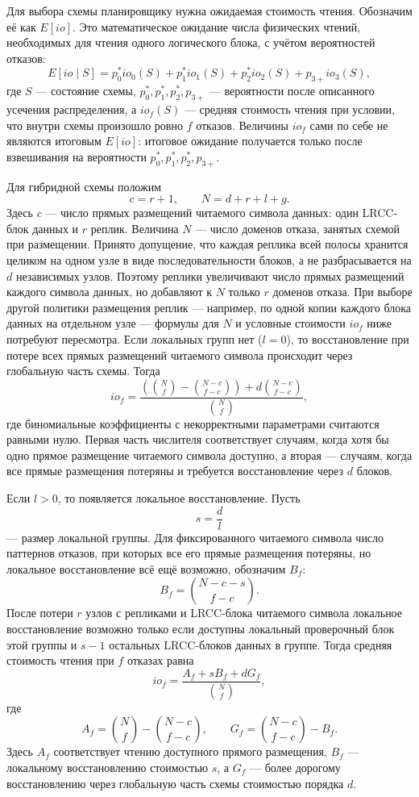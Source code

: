 Для выбора схемы планировщику нужна ожидаемая стоимость чтения. Обозначим её
как \(E[io]\). Это математическое ожидание числа физических чтений, необходимых
для чтения одного логического блока, с учётом вероятностей отказов:
\[
    E[io \mid S] =
    p_0^* io_0(S) + p_1^* io_1(S) + p_2^* io_2(S) + p_{3+} io_3(S),
\]
где \(S\) --- состояние схемы, \(p_0^*,p_1^*,p_2^*,p_{3+}\) --- вероятности
после описанного усечения распределения, а \(io_f(S)\) --- средняя стоимость
чтения при условии, что внутри схемы произошло ровно \(f\) отказов. Величины
\(io_f\) сами по себе не являются итоговым \(E[io]\): итоговое ожидание
получается только после взвешивания на вероятности \(p_0^*,p_1^*,p_2^*,p_{3+}\).

Для гибридной схемы положим
\[
    c = r + 1,\qquad N = d + r + l + g.
\]
Здесь \(c\) --- число прямых размещений читаемого символа данных: один
LRCC-блок данных и \(r\) реплик. Величина \(N\) --- число доменов отказа,
занятых схемой при размещении. Принято допущение, что каждая реплика всей
полосы хранится целиком на одном узле в виде последовательности блоков, а не
разбрасывается на \(d\) независимых узлов. Поэтому реплики увеличивают число
прямых размещений каждого символа данных, но добавляют к \(N\) только
\(r\) доменов отказа. При выборе другой политики размещения реплик ---
например, по одной копии каждого блока данных на отдельном узле --- формулы для
\(N\) и условные стоимости \(io_f\) ниже потребуют пересмотра.
Если локальных групп нет (\(l=0\)), то восстановление при потере всех прямых
размещений читаемого символа происходит через глобальную часть схемы. Тогда
\[
    io_f =
    \frac{
        \left(\binom{N}{f} - \binom{N-c}{f-c}\right)
        + d \binom{N-c}{f-c}
    }{
        \binom{N}{f}
    },
\]
где биномиальные коэффициенты с некорректными параметрами считаются равными
нулю. Первая часть числителя соответствует случаям, когда хотя бы одно прямое
размещение читаемого символа доступно, а вторая --- случаям, когда все прямые
размещения потеряны и требуется восстановление через \(d\) блоков.

Если \(l>0\), то появляется локальное восстановление. Пусть
\[
    s = \frac{d}{l}
\]
--- размер локальной группы. Для фиксированного читаемого символа число
паттернов отказов, при которых все его прямые размещения потеряны, но локальное
восстановление всё ещё возможно, обозначим \(B_f\):
\[
    B_f =
    \binom{N-c-s}{f-c}.
\]
После потери \(r\) узлов с репликами и LRCC-блока читаемого символа
локальное восстановление возможно только если доступны локальный проверочный
блок этой
группы и \(s-1\) остальных LRCC-блоков данных в группе. Тогда средняя
стоимость чтения при \(f\) отказах равна
\[
    io_f =
    \frac{
        A_f + s B_f + d G_f
    }{
        \binom{N}{f}
    },
\]
где
\[
    A_f = \binom{N}{f} - \binom{N-c}{f-c},
    \qquad
    G_f = \binom{N-c}{f-c} - B_f.
\]
Здесь \(A_f\) соответствует чтению доступного прямого размещения, \(B_f\) ---
локальному восстановлению стоимостью \(s\), а \(G_f\) --- более дорогому
восстановлению через глобальную часть схемы стоимостью порядка \(d\).

